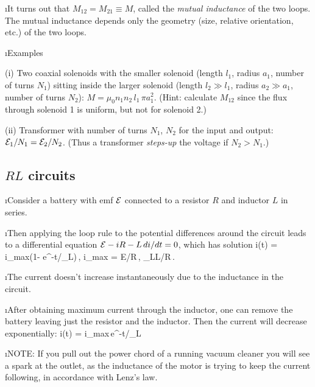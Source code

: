 \i It turns out that $M_{12}=M_{21}\equiv M$,
called the {\em mutual inductance} of the two 
loops.  
The mutual inductance depends only the geometry
(size, relative orientation, etc.) 
of the two loops.

\i Examples

(i) Two coaxial solenoids with the smaller solenoid 
(length $l_1$, radius $a_1$, number of turns $N_1$) 
sitting inside the  larger solenoid 
(length $l_2\gg l_1$, radius $a_2\gg a_1$, number of turns $N_2$):
$M = \mu_0 n_1 n_2\, l_1\,\pi a_1^2$.
(Hint: calculate $M_{12}$ since the flux through 
solenoid 1 is uniform, but not for solenoid 2.)

(ii) Transformer with number of turns $N_1$,
$N_2$ for the input and output:
${\cal E}_1/N_1 = {\cal E}_2/N_2$.
(Thus a transformer {\em steps-up} the voltage
if $N_2>N_1$.)

\ei
\subsection{$RL$ circuits}

\bi
\i Consider a battery with emf ${\cal E}$ connected to 
a resistor $R$ and inductor $L$ in series.

\i Then applying the loop rule to the potential differences
around the circuit leads to a differential equation
${\cal E}-iR - L\,di/dt=0$, which has solution
%
\be
i(t) = i_{\rm max}\left(1- e^{-t/\tau_L}\right)\,,
\quad
i_{\rm max} = {\cal E}/R\,,\quad
\tau_L\equiv L/R\,.
\ee

\i The current doesn't increase instantaneously
due to the inductance in the circuit.

\i After obtaining maximum current through the inductor,
one can remove the battery leaving just the resistor and
the inductor.
Then the current will decrease exponentially:
\be
i(t) = i_{\rm max}\,e^{-t/\tau_L}
\ee

\i NOTE: If you pull out the power chord of a running 
vacuum cleaner you will see a spark at the outlet, 
as the inductance of the motor is trying to keep the 
current following, in accordance with Lenz's law.

\ei

